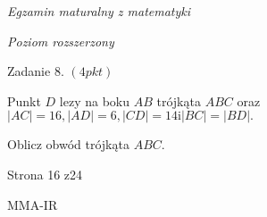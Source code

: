 \documentclass[a4paper,12pt]{article}
\begin{document}
{\it Egzamin maturalny z matematyki}

{\it Poziom rozszerzony}

Zadanie 8. $(4pkt)$

Punkt $D$ lezy na boku $AB$ trójkąta $ABC$ oraz $|AC|=16, |AD|=6, |CD|=14 \mathrm{i} |BC|=|BD|.$

Oblicz obwód trójkąta $ABC.$

Strona 16 z24

MMA-IR
\end{document}
